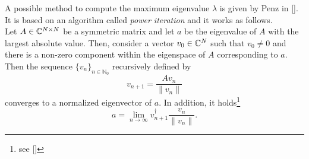 	A possible method to compute the maximum eigenvalue $\lambda$ is given by Penz in [\citealp{penz}]. It is based on an algorithm called \textit{power iteration} and it works as follows.\\
	Let $A\in{\mathbb C}^{N\times N}$ be a symmetric matrix and let $a$ be the eigenvalue of $A$ with the largest absolute value. Then, consider a vector $v_0\in{\mathbb C}^N$ such that $v_0\neq0$ and there is a non-zero component within the eigenspace of $A$ corresponding to $a$. Then the sequence $\{v_n\}_{n\in\mathbb{N}_0}$ recursively defined by
	\begin{equation}
		v_{n+1}=\frac{Av_n}{\|v_n\|}
	\end{equation}
	converges to a normalized eigenvector of $a$. In addition, it holds\footnote{see [\citealp[Sect. 7.3.1]{matrix}]}
	\begin{equation}
		a=\lim_{n\to\infty}v_{n+1}^\dagger\frac{v_n}{\|v_n\|}.
	\end{equation}
	
